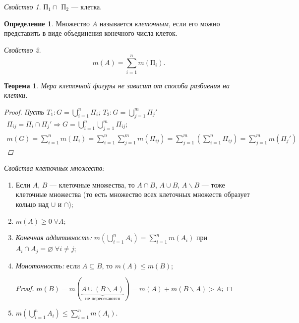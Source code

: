 \documentclass[a4paper,12pt]{article}
\let\emptyset\varnothing
\newtheorem*{theorem}{Теорема}
\theoremstyle{remark}
\newtheorem*{property}{Свойство}
\theoremstyle{definition}
\newtheorem{definition}{Определение}
\begin{document}
\begin{property}
    П\(_1 \cap\) П\(_2\) --- клетка.
\end{property}

\begin{definition}
    Множество \(A\) называется \emph{клеточным}, если его можно представить в виде объединения конечного числа клеток.
\end{definition}

\begin{property}
    \begin{equation*}
        m(A) = \sum_{i=1}^n m(\text{П}_i).
    \end{equation*}
\end{property}

\begin{theorem}
    Мера клеточной фигуры не зависит от способа разбиения на клетки.

    \begin{proof}
        Пусть \(T_1: G = \bigcup_{i=1}^n \Pi_i\); \(T_2: G = \bigcup_{j=1}^m \Pi_j'\) \\
        \begin{gather*}
            \Pi_{ij} = \Pi_i \cap \Pi_j' \Rightarrow G = \bigcup_{i=1}^n \bigcup_{j=1}^m \Pi_{ij};\\
            m(G) = \sum_{i=1}^n m(\Pi_i) = \sum_{i=1}^n \sum_{j=1}^m m(\Pi_{ij}) = \sum_{j=1}^m \left( \sum_{i=1}^n \Pi_{ij}\right) = \sum_{j=1}^m m(\Pi_j')
        \end{gather*}
    \end{proof}
\end{theorem}


\emph{Свойства клеточных множеств:}

\begin{enumerate}
    \item Если \(A\), \(B\) --- клеточные множества, то \(A \cap B\), \(A \cup B\), \(A \backslash B\) --- тоже клеточные множества (то есть множество всех клеточных множеств образует кольцо над \(\cup\) и  \(\cap\));
    \item \(m(A) \geqslant 0\;\forall A\);
    \item \emph{Конечная аддитивность:} \(m\left( \bigcup_{i=1}^n A_i\right) = \sum_{i=1}^n m(A_i)\) при \(A_i \cap A_j = \emptyset\; \forall i \neq j\);
    \item \emph{Монотонность:} если \(A \subseteq B\), то \(m(A) \leqslant m(B)\);
    \begin{proof}
        \(m(B) = m(\underbrace{A \cup (B \backslash A)}_{\text{не пересекаются}}) = m(A) + m(B \backslash A) > A\);
    \end{proof}
    \item \(m \left(\bigcup_{i=1}^n A_i \right) \leqslant \sum_{i=1}^n m(A_i)\).
\end{enumerate}
\end{document}

